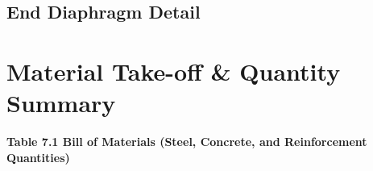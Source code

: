 \documentclass[12pt,a4paper]{report}
\numberwithin{table}{chapter}
\numberwithin{figure}{chapter}
\begin{document}
\section{End Diaphragm Detail}
\label{sec:diaphragm-detail}



\noindent
\begin{minipage}[t]{0.31\textwidth}
\centering
{}
\label{fig:ed-bracing-sec}
\end{minipage}
\hfill
\begin{minipage}[t]{0.31\textwidth}
\centering
{}
\label{fig:ed-top-chord}
\end{minipage}
\hfill
\begin{minipage}[t]{0.31\textwidth}
\centering
{}
\label{fig:ed-bottom-chord}
\end{minipage}



\chapter{Material Take-off \& Quantity Summary}
\label{ch:material-takeoff}

\noindent\textbf{Table 7.1  Bill of Materials (Steel, Concrete, and Reinforcement Quantities)}
\end{document}
